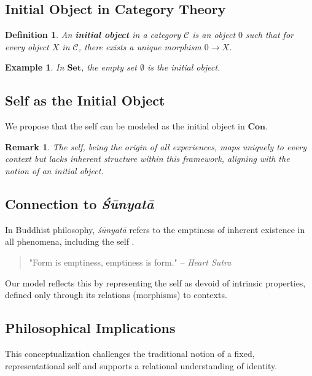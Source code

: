 \documentclass{article}
\newtheorem{definition}{Definition}[section]
\newtheorem{remark}{Remark}[section]
\newtheorem{example}{Example}[section]
\begin{document}
\subsection{Initial Object in Category Theory}

\begin{definition} An \textbf{initial object} in a category $\mathcal{C}$ is an object $0$ such that for every object $X$ in $\mathcal{C}$, there exists a unique morphism $0 \to X$. \end{definition}

\begin{example} In $\mathbf{Set}$, the empty set $\emptyset$ is the initial object. \end{example}

\subsection{Self as the Initial Object}

We propose that the self can be modeled as the initial object in $\mathbf{Con}$.

\begin{remark} The self, being the origin of all experiences, maps uniquely to every context but lacks inherent structure within this framework, aligning with the notion of an initial object. \end{remark}

\subsection{Connection to \emph{Śūnyatā}}

In Buddhist philosophy, \emph{śūnyatā} refers to the emptiness of inherent existence in all phenomena, including the self \cite{garfield1995}.

\begin{quote} "Form is emptiness, emptiness is form." -- \textit{Heart Sutra} \end{quote}

Our model reflects this by representing the self as devoid of intrinsic properties, defined only through its relations (morphisms) to contexts.

\subsection{Philosophical Implications}

This conceptualization challenges the traditional notion of a fixed, representational self and supports a relational understanding of identity.
\end{document}
